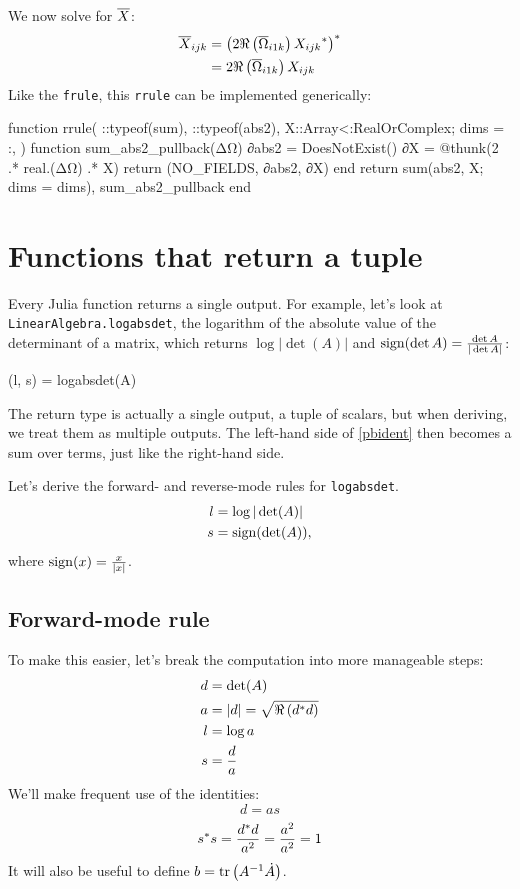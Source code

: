 \documentclass[../main.tex]{subfiles}
\begin{document}
\begin{refsection}
We now solve for $\overline{X}$:
\begin{align*}
\overline{X}_{ijk}
    &= {\left(
            2 \Re \left( \overline{\Omega}_{i1k} \right)
            { X_{ijk} }^*
        \right)}^*\\
    &= 2\Re \left( \overline{\Omega}_{i1k} \right) X_{ijk}
\end{align*}
Like the \texttt{frule}, this \texttt{rrule} can be implemented generically:
\begin{juliacode}
function rrule(
    ::typeof(sum),
    ::typeof(abs2),
    X::Array{<:RealOrComplex};
    dims = :,
)
    function sum_abs2_pullback(ΔΩ)
        ∂abs2 = DoesNotExist()
        ∂X = @thunk(2 .* real.(ΔΩ) .* X)
        return (NO_FIELDS, ∂abs2, ∂X)
    end
    return sum(abs2, X; dims = dims), sum_abs2_pullback
end
\end{juliacode}
\section{Functions that return a tuple}\label{functions-that-return-a-tuple}

Every Julia function returns a single output.
For example, let's look at \texttt{LinearAlgebra.logabsdet}, the logarithm of the absolute value of the determinant of a matrix, which returns $\log |\det(A)|$ and $\operatorname{sign}(\det A) = \frac{\det A}{| \det A |}$:
\begin{juliacode}
(l, s) = logabsdet(A)
\end{juliacode}
The return type is actually a single output, a tuple of scalars, but when deriving, we treat them as multiple outputs.
The left-hand side of \eqref{pbident} then becomes a sum over terms, just like the right-hand side.

Let's derive the forward- and reverse-mode rules for \texttt{logabsdet}.
\begin{align*}
l &= \log |\det(A)|\\
s &= \operatorname{sign}(\det(A)),
\end{align*}
where $\operatorname{sign}(x) = \frac{x}{|x|}$.

\subsection{Forward-mode rule}\label{forward-mode-rule}

To make this easier, let's break the computation into more manageable steps:
\begin{align*}
d &= \det(A)\\
a &= |d| = \sqrt{\Re \left( {d}^* d \right)}\\
l &= \log a\\
s &= \frac{d}{a}
\end{align*}
We'll make frequent use of the identities:
\[d = a s\]
\[{s}^* s = \frac{{d}^* d}{a^2} = \frac{a^2}{a^2} = 1\]
It will also be useful to define $b = \operatorname{tr}\left( A^{-1} \dot{A} \right)$.


\end{refsection}
\end{document}

